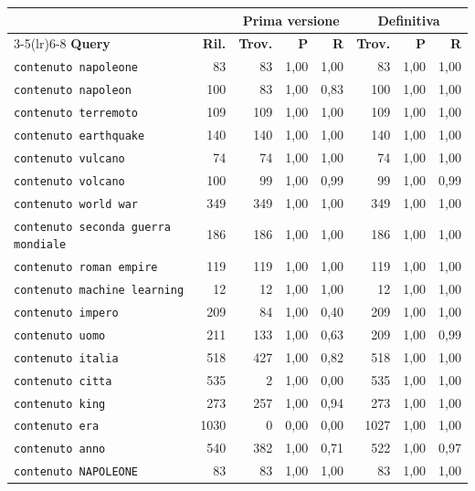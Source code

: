 \documentclass[11pt,a4paper]{article}
\newcommand{\dq}{\textquotedbl}            %
\newcommand{\code}[1]{\texttt{#1}}
\begin{document}
\begin{table}[H]
\centering
\footnotesize
\begin{tabularx}{\linewidth}{@{}Xrrrrrrr@{}}
\toprule
& & \multicolumn{3}{c}{\textbf{Prima versione}} & \multicolumn{3}{c}{\textbf{Definitiva}} \\
\cmidrule(lr){3-5}\cmidrule(lr){6-8}
\textbf{Query} & \textbf{Ril.} & \textbf{Trov.} & \textbf{P} & \textbf{R} & \textbf{Trov.} & \textbf{P} & \textbf{R} \\
\midrule
\code{contenuto napoleone} & 83 & 83 & 1,00 & 1,00 & 83 & 1,00 & 1,00 \\
\code{contenuto napoleon} & 100 & 83 & 1,00 & 0,83 & 100 & 1,00 & 1,00 \\
\code{contenuto terremoto} & 109 & 109 & 1,00 & 1,00 & 109 & 1,00 & 1,00 \\
\code{contenuto earthquake} & 140 & 140 & 1,00 & 1,00 & 140 & 1,00 & 1,00 \\
\code{contenuto vulcano} & 74 & 74 & 1,00 & 1,00 & 74 & 1,00 & 1,00 \\
\code{contenuto volcano} & 100 & 99 & 1,00 & 0,99 & 99 & 1,00 & 0,99 \\
\code{contenuto \dq{}world war\dq{}} & 349 & 349 & 1,00 & 1,00 & 349 & 1,00 & 1,00 \\
\code{contenuto \dq{}seconda guerra mondiale\dq{}} & 186 & 186 & 1,00 & 1,00 & 186 & 1,00 & 1,00 \\
\code{contenuto \dq{}roman empire\dq{}} & 119 & 119 & 1,00 & 1,00 & 119 & 1,00 & 1,00 \\
\code{contenuto \dq{}machine learning\dq{}} & 12 & 12 & 1,00 & 1,00 & 12 & 1,00 & 1,00 \\
\code{contenuto impero} & 209 & 84 & 1,00 & 0,40 & 209 & 1,00 & 1,00 \\
\code{contenuto uomo} & 211 & 133 & 1,00 & 0,63 & 209 & 1,00 & 0,99 \\
\code{contenuto italia} & 518 & 427 & 1,00 & 0,82 & 518 & 1,00 & 1,00 \\
\code{contenuto citta} & 535 & 2 & 1,00 & 0,00 & 535 & 1,00 & 1,00 \\
\code{contenuto king} & 273 & 257 & 1,00 & 0,94 & 273 & 1,00 & 1,00 \\
\code{contenuto era} & 1030 & 0 & 0,00 & 0,00 & 1027 & 1,00 & 1,00 \\
\code{contenuto anno} & 540 & 382 & 1,00 & 0,71 & 522 & 1,00 & 0,97 \\
\code{contenuto NAPOLEONE} & 83 & 83 & 1,00 & 1,00 & 83 & 1,00 & 1,00 \\

\end{tabularx}
\end{table}
\end{document}

